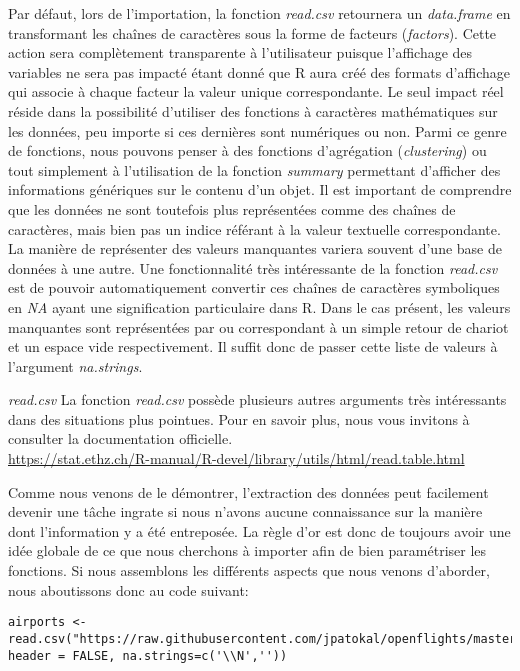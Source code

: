 \noindent
Par défaut, lors de l'importation, la fonction \emph{read.csv} retournera un \emph{data.frame} en transformant les chaînes de caractères sous la forme de facteurs (\emph{factors}). Cette action sera complètement transparente à l'utilisateur puisque l'affichage des variables ne sera pas impacté étant donné que R aura créé des formats d'affichage qui associe à chaque facteur la valeur unique correspondante. Le seul impact réel réside dans la possibilité d'utiliser des fonctions à caractères mathématiques sur les données, peu importe si ces dernières sont numériques ou non. Parmi ce genre de fonctions, nous pouvons penser à des fonctions d'agrégation (\emph{clustering}) ou tout simplement à l'utilisation de la fonction \emph{summary} \cite{Rfunction:summary} permettant d'afficher des informations génériques sur le contenu d'un objet. Il est important de comprendre que les données ne sont toutefois plus représentées comme des chaînes de caractères, mais bien pas un indice référant à la valeur textuelle correspondante. \\

\noindent
La manière de représenter des valeurs manquantes variera souvent d'une base de données à une autre. Une fonctionnalité très intéressante de la fonction \emph{read.csv} est de pouvoir automatiquement convertir ces chaînes de caractères symboliques en \emph{NA} ayant une signification particulaire dans R. Dans le cas présent, les valeurs manquantes sont représentées par  ou  correspondant à un simple retour de chariot et un espace vide respectivement. Il suffit donc de passer cette liste de valeurs à l'argument \emph{na.strings}. \\

\begin{moreInfo}{\emph{read.csv}}
	La fonction \emph{read.csv} possède plusieurs autres arguments très intéressants dans des situations plus pointues. Pour en savoir plus, nous vous invitons à consulter la documentation officielle. \\
	\url{https://stat.ethz.ch/R-manual/R-devel/library/utils/html/read.table.html}
\end{moreInfo}

\noindent
Comme nous venons de le démontrer, l'extraction des données peut facilement devenir une tâche ingrate si nous n'avons aucune connaissance sur la manière dont l'information y a été entreposée. La règle d'or est donc de toujours avoir une idée globale de ce que nous cherchons à importer afin de bien paramétriser les fonctions. Si nous assemblons les différents aspects que nous venons d'aborder, nous aboutissons donc au code suivant:
\begin{lstlisting}[caption = Extraction des données,label=src:Extraction]
	airports <- read.csv("https://raw.githubusercontent.com/jpatokal/openflights/master/data/airports.dat", header = FALSE, na.strings=c('\\N',''))
\end{lstlisting}